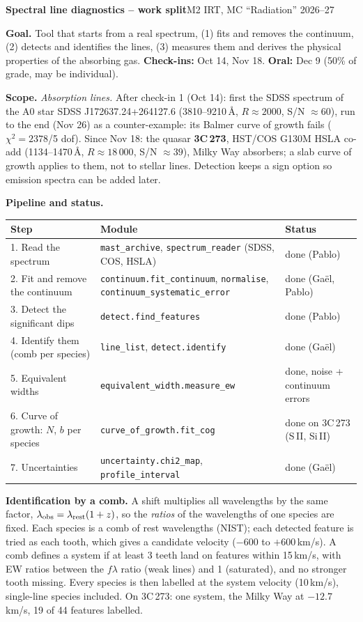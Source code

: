 \documentclass[10pt,a4paper]{article}
\begin{document}
{\Large\bfseries Spectral line diagnostics -- work split}\hfill{\small M2 IRT, MC ``Radiation'' 2026--27}

\textbf{Goal.} Tool that starts from a real spectrum, (1) fits and removes the continuum, (2) detects and identifies the lines, (3) measures them and derives the physical properties of the absorbing gas. \textbf{Check-ins:} Oct 14, Nov 18. \textbf{Oral:} Dec 9 (50\% of grade, may be individual).

\textbf{Scope.} \emph{Absorption lines.} After check-in 1 (Oct 14): first the SDSS spectrum of the A0 star SDSS J172637.24+264127.6 (3810--9210\,\AA, $R\approx2000$, S/N $\approx60$), run to the end (Nov 26) as a counter-example: its Balmer curve of growth fails ($\chi^2=2378$/5 dof). Since Nov 18: the quasar \textbf{3C\,273}, HST/COS G130M HSLA co-add (1134--1470\,\AA, $R\approx18\,000$, S/N $\approx39$), Milky Way absorbers; a slab curve of growth applies to them, not to stellar lines. Detection keeps a sign option so emission spectra can be added later.

\textbf{Pipeline and status.}\par
\begin{tabular}{@{}p{5.2cm}p{7.3cm}p{4cm}@{}}
\toprule
Step & Module & Status \\
\midrule
1. Read the spectrum & \texttt{mast\_archive}, \texttt{spectrum\_reader} (SDSS, COS, HSLA) & done (Pablo) \\
2. Fit and remove the continuum & \texttt{continuum.fit\_continuum}, \texttt{normalise}, \texttt{continuum\_systematic\_error} & done (Gaël, Pablo) \\
3. Detect the significant dips & \texttt{detect.find\_features} & done (Pablo) \\
4. Identify them (comb per species) & \texttt{line\_list}, \texttt{detect.identify} & done (Gaël) \\
5. Equivalent widths & \texttt{equivalent\_width.measure\_ew} & done, noise + continuum errors \\
6. Curve of growth: $N$, $b$ per species & \texttt{curve\_of\_growth.fit\_cog} & done on 3C\,273 (S\,II, Si\,II) \\
7. Uncertainties & \texttt{uncertainty.chi2\_map}, \texttt{profile\_interval} & done (Gaël) \\
\bottomrule
\end{tabular}

\textbf{Identification by a comb.} A shift multiplies all wavelengths by the same factor, $\lambda_{\rm obs}=\lambda_{\rm rest}(1+z)$, so the \emph{ratios} of the wavelengths of one species are fixed. Each species is a comb of rest wavelengths (NIST); each detected feature is tried as each tooth, which gives a candidate velocity ($-600$ to $+600$\,km/s). A comb defines a system if at least 3 teeth land on features within 15\,km/s, with EW ratios between the $f\lambda$ ratio (weak lines) and 1 (saturated), and no stronger tooth missing. Every species is then labelled at the system velocity (10\,km/s), single-line species included. On 3C\,273: one system, the Milky Way at $-12.7$\,km/s, 19 of 44 features labelled.
\end{document}
